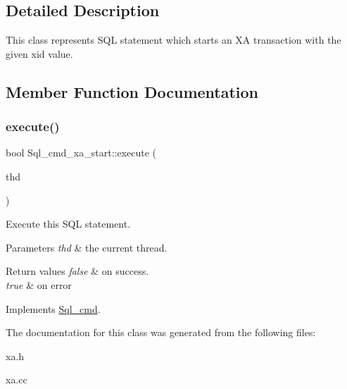 \subsection{Detailed Description}
This class represents S\+QL statement which starts an XA transaction with the given xid value. 

\subsection{Member Function Documentation}
\mbox{\label{classSql__cmd__xa__start_a1aec90983e7360a72906ac004b792d4f}} 
\subsubsection{\texorpdfstring{execute()}{execute()}}
{\footnotesize\ttfamily bool Sql\+\_\+cmd\+\_\+xa\+\_\+start\+::execute (\begin{DoxyParamCaption}\item[{T\+HD $\ast$}]{thd }\end{DoxyParamCaption})\hspace{0.3cm}{\ttfamily [virtual]}}

Execute this S\+QL statement. 
\begin{DoxyParams}{Parameters}
{\em thd} & the current thread. \\
\hline
\end{DoxyParams}

\begin{DoxyRetVals}{Return values}
{\em false} & on success. \\
\hline
{\em true} & on error \\
\hline
\end{DoxyRetVals}


Implements \mbox{\hyperlink{classSql__cmd_a213367b79b551296fbb7790f2a3732fb}{Sql\+\_\+cmd}}.



The documentation for this class was generated from the following files\+:\begin{DoxyCompactItemize}
\item 
xa.\+h\item 
xa.\+cc\end{DoxyCompactItemize}

